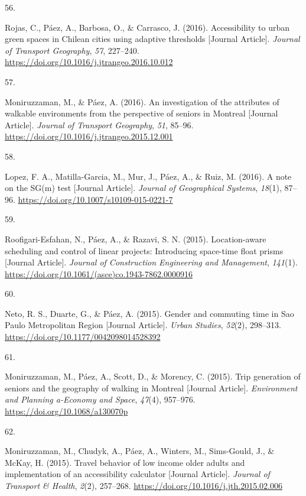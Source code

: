 \documentclass[11pt,a4paper,]{awesome-cv}
\newlength{\cslhangindent}
\newlength{\csllabelwidth}
\newenvironment{CSLReferences}[2] %
 {\begin{list}{}{%
  \setlength{\itemindent}{0pt}
  \setlength{\leftmargin}{0pt}
  \setlength{\parsep}{0pt}
  \ifodd #1
   \setlength{\leftmargin}{\cslhangindent}
   \setlength{\itemindent}{-1\cslhangindent}
  \fi
  \setlength{\itemsep}{#2\baselineskip}}}
 {\end{list}}
\newcommand{\CSLLeftMargin}[1]{\parbox[t]{\csllabelwidth}{\strut#1\strut}}
\newcommand{\CSLRightInline}[1]{\parbox[t]{\linewidth - \csllabelwidth}{\strut#1\strut}}
\begin{document}
\begin{CSLReferences}{0}{0}
\CSLLeftMargin{56. }%
\CSLRightInline{Rojas, C., Páez, A., Barbosa, O., \& Carrasco, J.
(2016). Accessibility to urban green spaces in Chilean cities using
adaptive thresholds {[}Journal Article{]}. \emph{Journal of Transport
Geography}, \emph{57}, 227--240.
\url{https://doi.org/10.1016/j.jtrangeo.2016.10.012}}

\CSLLeftMargin{57. }%
\CSLRightInline{Moniruzzaman, M., \& Páez, A. (2016). An investigation
of the attributes of walkable environments from the perspective of
seniors in Montreal {[}Journal Article{]}. \emph{Journal of Transport
Geography}, \emph{51}, 85--96.
\url{https://doi.org/10.1016/j.jtrangeo.2015.12.001}}

\CSLLeftMargin{58. }%
\CSLRightInline{Lopez, F. A., Matilla-Garcia, M., Mur, J., Páez, A., \&
Ruiz, M. (2016). A note on the SG(m) test {[}Journal Article{]}.
\emph{Journal of Geographical Systems}, \emph{18}(1), 87--96.
\url{https://doi.org/10.1007/s10109-015-0221-7}}

\CSLLeftMargin{59. }%
\CSLRightInline{Roofigari-Esfahan, N., Páez, A., \& Razavi, S. N.
(2015). Location-aware scheduling and control of linear projects:
Introducing space-time float prisms {[}Journal Article{]}. \emph{Journal
of Construction Engineering and Management}, \emph{141}(1).
\url{https://doi.org/10.1061/(asce)co.1943-7862.0000916}}

\CSLLeftMargin{60. }%
\CSLRightInline{Neto, R. S., Duarte, G., \& Páez, A. (2015). Gender and
commuting time in Sao Paulo Metropolitan Region {[}Journal Article{]}.
\emph{Urban Studies}, \emph{52}(2), 298--313.
\url{https://doi.org/10.1177/0042098014528392}}

\CSLLeftMargin{61. }%
\CSLRightInline{Moniruzzaman, M., Páez, A., Scott, D., \& Morency, C.
(2015). Trip generation of seniors and the geography of walking in
Montreal {[}Journal Article{]}. \emph{Environment and Planning a-Economy
and Space}, \emph{47}(4), 957--976.
\url{https://doi.org/10.1068/a130070p}}

\CSLLeftMargin{62. }%
\CSLRightInline{Moniruzzaman, M., Chudyk, A., Páez, A., Winters, M.,
Sims-Gould, J., \& McKay, H. (2015). Travel behavior of low income older
adults and implementation of an accessibility calculator {[}Journal
Article{]}. \emph{Journal of Transport \& Health}, \emph{2}(2),
257--268. \url{https://doi.org/10.1016/j.jth.2015.02.006}}


\end{CSLReferences}
\end{document}
